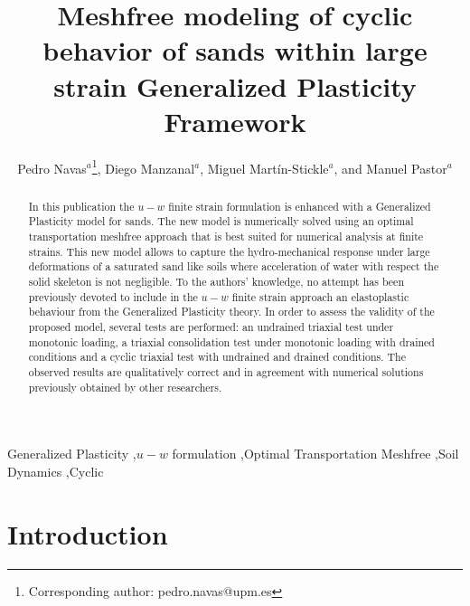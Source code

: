\documentclass[preprint,12pt,a4paper]{elsarticle}
\begin{document}
\begin{frontmatter}

\title{Meshfree modeling of cyclic behavior of sands within large strain Generalized Plasticity Framework}

\author{
Pedro Navas$^a$\footnote{Corresponding author: pedro.navas@upm.es},
Diego Manzanal$^a$,
Miguel Mart\'in-Stickle$^{a}$,
and  Manuel Pastor$^a$
 }
 \address{
 $^a$ ETSI Caminos, Canales y Puertos, Universidad Polit\'ectnica de Madrid.\\ c. Prof. Aranguren 3, 28040 Madrid, Spain
}

\begin{abstract}

In this publication the $u-w$ finite strain formulation is enhanced with a Generalized Plasticity model for sands. The new model is numerically solved using an optimal transportation meshfree approach that is best suited for numerical analysis at finite strains. This new model allows to capture the hydro-mechanical response under large deformations of a saturated sand like soils where acceleration of water with respect the solid skeleton is not negligible. To the authors' knowledge, no attempt has been previously devoted to include in the $u-w$ finite strain approach an elastoplastic behaviour from the Generalized Plasticity theory. In order to assess the validity of the proposed model, several tests are performed: an undrained triaxial test under monotonic loading, a triaxial consolidation test under monotonic loading with drained conditions and a cyclic triaxial test with undrained and drained conditions. The observed results are qualitatively correct and in agreement with numerical solutions previously obtained by other researchers.
\end{abstract}

\begin{keyword}
Generalized Plasticity \sep $u-w$ formulation \sep Optimal Transportation Meshfree \sep Soil Dynamics \sep Cyclic
\end{keyword}

\end{frontmatter}

\linenumbers

\section{Introduction}
\label{sec:1}
\end{document}
